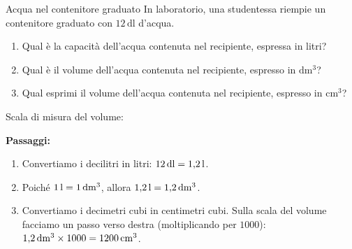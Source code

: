 

\begin{esercizio}{Acqua nel contenitore graduato}
In laboratorio, una studentessa riempie un contenitore graduato con $12\,\mathrm{dl}$ d'acqua.

\begin{enumerate}[label=\alph*)]
  \item Qual è la capacità dell'acqua contenuta nel recipiente, espressa in litri?
  \item Qual è il volume dell'acqua contenuta nel recipiente, espresso in $\mathrm{dm^3}$?
  \item Qual esprimi il volume dell'acqua contenuta nel recipiente, espresso in $\mathrm{cm^3}$?
\end{enumerate}

Scala di misura del volume: 

\responsespace{6.4cm}

\begin{soluzione}
  \textbf{Passaggi:}
  \begin{enumerate}[label=\alph*)]
    \item Convertiamo i decilitri in litri: $12\,\mathrm{dl} = 1{,}2\,\mathrm{l}$.
    \item Poiché $1\,\mathrm{l} = 1\,\mathrm{dm^3}$, allora $1{,}2\,\mathrm{l} = 1{,}2\,\mathrm{dm^3}$.
    \item Convertiamo i decimetri cubi in centimetri cubi. Sulla scala del volume facciamo un passo verso destra (moltiplicando per $1000$): $1{,}2\,\mathrm{dm^3} \times 1000 = 1200\,\mathrm{cm^3}$.
  \end{enumerate}
\end{soluzione}
\end{esercizio}

\condnewpage

